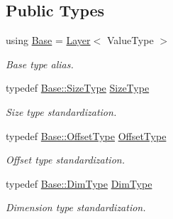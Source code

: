 \subsection*{Public Types}
\begin{DoxyCompactItemize}
\item 
using \hyperlink{classffnn_1_1layer_1_1_output_a76c3074490fd13bd2cdd86f53322da45}{Base} = \hyperlink{classffnn_1_1layer_1_1_layer}{Layer}$<$ Value\-Type $>$
\begin{DoxyCompactList}\small\item\em Base type alias. \end{DoxyCompactList}\item 
typedef \hyperlink{classffnn_1_1layer_1_1internal_1_1_interface_af0567642f60c65b5e87067226a54174b}{Base\-::\-Size\-Type} \hyperlink{classffnn_1_1layer_1_1_output_a5e41de6c9249494dd9c6a819d7a30e20}{Size\-Type}
\begin{DoxyCompactList}\small\item\em Size type standardization. \end{DoxyCompactList}\item 
typedef \hyperlink{classffnn_1_1layer_1_1_layer_a0e35ffd6e0657856f3a75323b2db9fcb}{Base\-::\-Offset\-Type} \hyperlink{classffnn_1_1layer_1_1_output_a6780ece144b80cb2be355dd65096e9db}{Offset\-Type}
\begin{DoxyCompactList}\small\item\em Offset type standardization. \end{DoxyCompactList}\item 
typedef \hyperlink{classffnn_1_1layer_1_1internal_1_1_interface_a8d121d0103f254b51e48f7b20a17681f}{Base\-::\-Dim\-Type} \hyperlink{classffnn_1_1layer_1_1_output_a1c45baba082c15f0a2f579a9b150cb9d}{Dim\-Type}
\begin{DoxyCompactList}\small\item\em Dimension type standardization. \end{DoxyCompactList}\end{DoxyCompactItemize}
